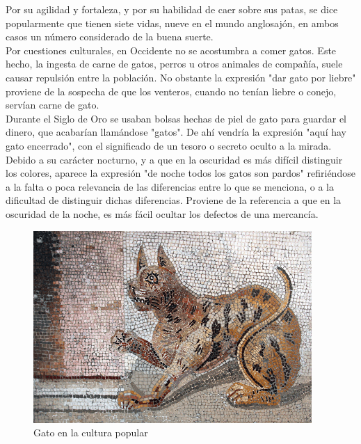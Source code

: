 \documentclass[a4paper]{article}
\begin{document}
Por su agilidad y fortaleza, y por su habilidad de caer sobre sus patas, se dice popularmente que tienen siete vidas, nueve en el mundo anglosajón, en ambos casos un número considerado de la buena suerte.\\

Por cuestiones culturales, en Occidente no se acostumbra a comer gatos. Este hecho, la ingesta de carne de gatos, perros u otros animales de compañía, suele causar repulsión entre la población. No obstante la expresión "dar gato por liebre" proviene de la sospecha de que los venteros, cuando no tenían liebre o conejo, servían carne de gato.\\

Durante el Siglo de Oro se usaban bolsas hechas de piel de gato para guardar el dinero, que acabarían llamándose "gatos". De ahí vendría la expresión "aquí hay gato encerrado", con el significado de un tesoro o secreto oculto a la mirada.\\

Debido a su carácter nocturno, y a que en la oscuridad es más difícil distinguir los colores, aparece la expresión "de noche todos los gatos son pardos" refiriéndose a la falta o poca relevancia de las diferencias entre lo que se menciona, o a la dificultad de distinguir dichas diferencias. Proviene de la referencia a que en la oscuridad de la noche, es más fácil ocultar los defectos de una mercancía.\\

\begin{figure}[h!]
\centering
\includegraphics[scale=0.7]{gato4.png}
\caption{Gato en la cultura popular}
\label{fig:Gato4}
\end{figure}

\pagebreak
\end{document}
